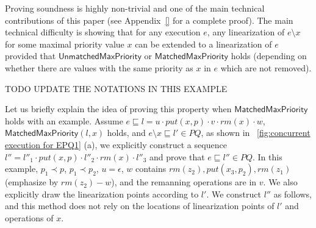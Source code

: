 Proving soundness is highly non-trivial and one of the main technical contributions of this paper (see Appendix~\ref{} for a complete proof). The main technical difficulty is showing that for any execution $e$, any linearization of $e\setminus x$ for some maximal priority value $x$ can be extended to a linearization of $e$ provided that $\mathsf{UnmatchedMaxPriority}$ or $\mathsf{MatchedMaxPriority}$ holds (depending on whether there are values with the same priority as $x$ in $e$ which are not removed).
%
%
%
%
%
%

TODO UPDATE THE NOTATIONS IN THIS EXAMPLE

Let us briefly explain the idea of proving this property when $\mathsf{MatchedMaxPriority}$ holds with an example. Assume $e \sqsubseteq l=u \cdot \textit{put}(x,p) \cdot v \cdot \textit{rm}(x) \cdot w$, $\mathsf{MatchedMaxPriority}(l,x)$ holds, and $e \setminus x \sqsubseteq l' \in \textit{PQ}$, as shown in \figurename~\ref{fig:concurrent execution for EPQ1} (a), we explicitly construct a sequence $l''= l''_1 \cdot \textit{put}(x,p) \cdot l''_2 \cdot \textit{rm}(x) \cdot l''_3$ and prove that $e \sqsubseteq l'' \in \textit{PQ}$. In this example, $p_1 \prec p$, $p_1 \prec p_2$, $u=\epsilon$, $w$ contains $\textit{rm}(z_2), \textit{put}(x_3,p_2), \textit{rm}(z_1)$ (emphasize by $\textit{rm}(z_2)-w$), and the remanning operations are in $v$. We also explicitly draw the linearization points according to $l'$. We construct $l''$ as follows, and this method does not rely on the locations of linearization points of $l'$ and operations of $x$. 

